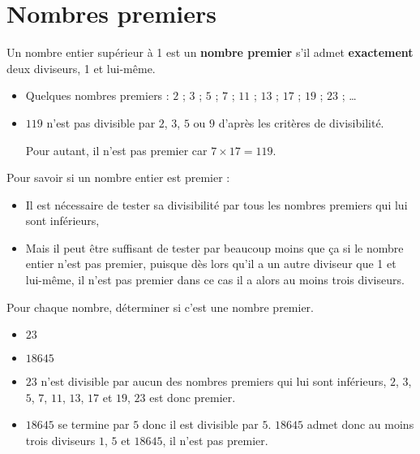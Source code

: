 \section{Nombres premiers}
\begin{definition}
	Un nombre entier supérieur à 1 est un \textbf{nombre premier} s'il admet \textbf{exactement} deux diviseurs, 1 et lui-même.
\end{definition}

\begin{remarque}
	\begin{itemize}
		\item Quelques nombres premiers : $2$ ; $3$ ; $5$ ; $7$ ; $11$ ; $13$ ; $17$ ; $19$ ; $23$ ; \ldots
		\item $119$ n'est pas divisible par $2$, $3$, $5$ ou $9$ d'après les critères de divisibilité.
		
		Pour autant, il n'est pas premier car $7\times 17 = 119$. 
	\end{itemize}
\end{remarque}	

\begin{methode}
	Pour savoir si un nombre entier est premier :
	\begin{itemize}
		\item Il est nécessaire de tester sa divisibilité par tous les nombres premiers qui lui sont inférieurs,
		\item Mais il peut être suffisant de tester par beaucoup moins que ça si le nombre entier n'est pas premier, puisque dès lors qu'il a un autre diviseur que 1 et lui-même, il n'est pas premier dans ce cas il a alors au moins trois diviseurs. 
	\end{itemize}
	\exercice
	Pour chaque nombre, déterminer si c'est une nombre premier.
	
	\begin{itemize}
		\item $23$
		\item $\num{18645}$
	\end{itemize}

	\correction
	\begin{itemize}
		\item $23$ n'est divisible par aucun des nombres premiers qui lui sont inférieurs, $2$, $3$, $5$, $7$, $11$, $13$, $17$ et $19$, $23$ est donc premier.
		\item $\num{18645}$ se termine par $5$ donc il est divisible par $5$.
		$\num{18645}$ admet donc au moins trois diviseurs $1$, $5$ et $\num{18645}$, il n'est pas premier.
	\end{itemize}
\end{methode}

